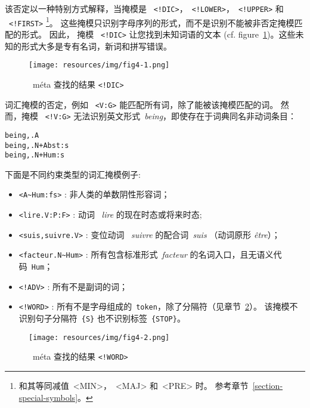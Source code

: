\bigskip
\noindent  该否定以一种特别方式解释，当掩模是 
\ \verb+<!DIC>+，\ \verb+<!LOWER>+，\ \verb+<!UPPER>+ 和
\ \verb+<!FIRST>+ \footnote{和其等同减值\ <MIN>，\ <MAJ> 和\ <PRE> 时。 参考章节~\ref{section-special-symbols}。}。
 这些掩模只识别字母序列的形式，而不是识别不能被非否定掩模匹配的形式。 因此， 掩模 \ \verb+<!DIC>+ 让您找到未知词语的文本
 (cf. figure~\ref{fig-search-<!DIC>})。这些未知的形式大多是专有名词，新词和拼写错误。

\bigskip
\begin{figure}[h]
\begin{center}
\texttt{[image: resources/img/fig4-1.png]}
\caption{\ méta 查找的结果 \texttt{<!DIC>}\label{fig-search-<!DIC>}}
\end{center}
\end{figure}

\bigskip
\noindent 词汇掩模的否定，例如 \ \verb+<V:G>+ 能匹配所有词，除了能被该掩模匹配的词。 然而，掩模 \ \verb+<!V:G>+ 无法识别英文形式\ \emph{being}，即使存在于词典同名非动词条目：


\begin{verbatim}
being,.A
being,.N+Abst:s
being,.N+Hum:s
\end{verbatim}

\noindent 下面是不同约束类型的词汇掩模例子:

\begin{itemize}
  \item \verb$<A~Hum:fs>$ : 非人类的单数阴性形容词；
  \item \verb+<lire.V:P:F>+ : 动词 \ \textit{lire} 的现在时态或将来时态;
  \item \verb$<suis,suivre.V>$ : 变位动词 \ \textit{suivre} 的配合词\ \textit{suis} 
  	  （动词原形 \textit{être}）；
  \item \verb$<facteur.N~Hum>$ : 所有包含标准形式\ \textit{facteur} 的名词入口，且无语义代码\ \verb+Hum+；
  \item \verb$<!ADV>$ : 所有不是副词的词；
  \item \verb$<!WORD>$ : 所有不是字母组成的\ \verb+token+，除了分隔符（见章节~\ref{fig-search-<!WORD>}）。 该掩模不识别句子分隔符\ \verb+{S}+ 也不识别标签\ \verb+{STOP}+。
\end{itemize}

\bigskip
\begin{figure}[h]
\begin{center}
\texttt{[image: resources/img/fig4-2.png]}
\caption{\ méta 查找的结果
\texttt{<!WORD>}\label{fig-search-<!WORD>}}
\end{center}
\end{figure}

